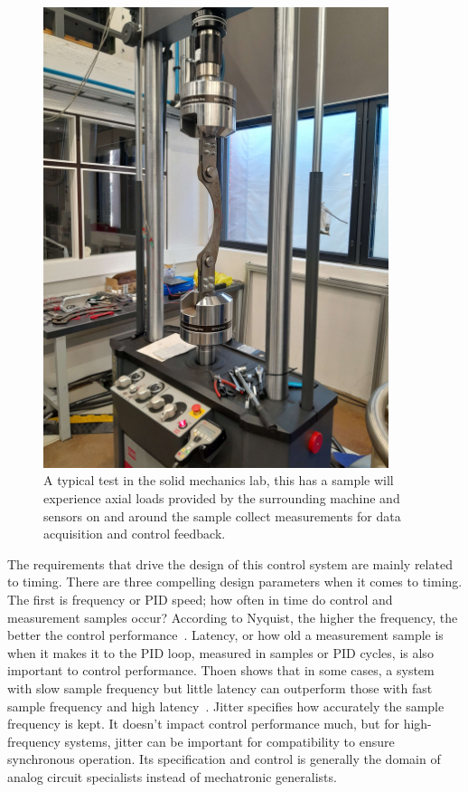 \documentclass[english,12pt,a4paper,pdftex,eng,utf8]{aaltothesis}
\begin{document}
\begin{figure}[h]
  \centering
  \includegraphics[width=0.90\textwidth]{assets/solid_mechanics_test_rig}
  \caption{A typical test in the solid mechanics lab, this has a sample will experience axial loads provided by the surrounding machine and sensors on and around the sample collect measurements for data acquisition and control feedback.}\label{fig:solid_mechanics_test_rig}
\end{figure}

The requirements that drive the design of this control system are mainly related to timing.  There are three compelling design parameters when it comes to timing.  The first is frequency or PID speed; how often in time do control and measurement samples occur?  According to Nyquist, the higher the frequency, the better the control performance~\cite{Nyquist1928}.  Latency, or how old a measurement sample is when it makes it to the PID loop, measured in samples or PID cycles, is also important to control performance.  Thoen shows that in some cases, a system with slow sample frequency but little latency can outperform those with fast sample frequency and high latency~\cite{Thoen2021}.  Jitter specifies how accurately the sample frequency is kept.  It doesn't impact control performance much, but for high-frequency systems, jitter can be important for compatibility to ensure synchronous operation.  Its specification and control is generally the domain of analog circuit specialists instead of mechatronic generalists.
\end{document}
